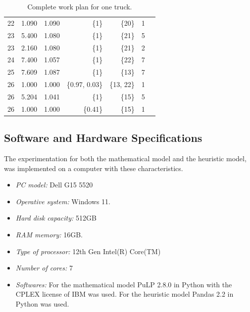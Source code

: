 \documentclass{amsart}
\begin{document}
\begin{table}[!htp]
\begin{tabular}{lrrrrrr}
            22 &1.090 &1.090 &\{1\} &\{20\} &1 \\
            23 &5.400 &1.080 &\{1\} &\{21\} &5 \\ 
            23 &2.160 &1.080 &\{1\} &\{21\} &2 \\
            24 &7.400 &1.057 &\{1\} &\{22\} &7 \\
            25 &7.609 &1.087 &\{1\} &\{13\} &7 \\
            26 &1.000 &1.000 &\{0.97, 0.03\} &\{13, 22\} &1 \\
            26 &5.204 &1.041 &\{1\} &\{15\} &5 \\
            26 &1.000 &1.000 &\{0.41\} &\{15\} &1 \\
            \bottomrule
            \end{tabular}
            \vspace{10pt}
            \caption{Complete work plan for one truck.}\label{tab:DistribucionViajes}
        \end{table}
            
            
            
            
       
            \subsection{Software and Hardware Specifications}
            
            The experimentation for both the mathematical model and the heuristic model, was implemented on a computer with these characteristics.
    
            \begin{itemize}
                \item \textit{PC model:} Dell G15 5520
                \item \textit{Operative system:} Windows 11.
                \item \textit{Hard disk capacity:} 512GB
                \item \textit{RAM memory:} 16GB.
                \item \textit{Type of processor:} 12th Gen Intel(R) Core(TM)
                \item \textit{Number of cores:} 7
                \item \textit{Softwares:} For the mathematical model PuLP 2.8.0 in Python with the CPLEX license of IBM was used. For the heuristic model Pandas 2.2 in Python was used.
            \end{itemize}
            
\end{document}
